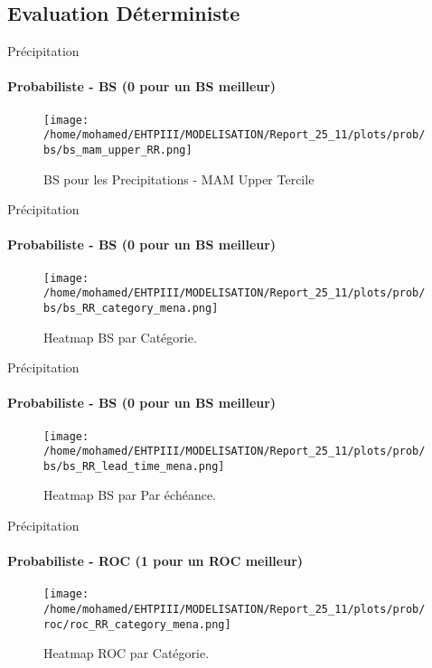 \subsection{Evaluation Déterministe}

\begin{frame}{Précipitation}
\framesubtitle{Probabiliste - BS (0 pour un BS meilleur)}

\begin{figure}
    \centering
    \texttt{[image: /home/mohamed/EHTPIII/MODELISATION/Report\_25\_11/plots/prob/bs/bs\_mam\_upper\_RR.png]}
    \caption{BS pour les Precipitations - MAM  Upper Tercile }
    \label{fig:enter-label}
\end{figure}
\end{frame}

\begin{frame}{Précipitation}
\framesubtitle{Probabiliste - BS (0 pour un BS meilleur)}

\begin{figure}
    \centering
    \texttt{[image: /home/mohamed/EHTPIII/MODELISATION/Report\_25\_11/plots/prob/bs/bs\_RR\_category\_mena.png]}
    \caption{Heatmap BS par Catégorie.  }
    \label{fig:enter-label}
\end{figure}
\end{frame}


\begin{frame}{Précipitation}
\framesubtitle{Probabiliste - BS (0 pour un BS meilleur)}

\begin{figure}
    \centering
    \texttt{[image: /home/mohamed/EHTPIII/MODELISATION/Report\_25\_11/plots/prob/bs/bs\_RR\_lead\_time\_mena.png]}
    \caption{Heatmap BS par Par échéance.}
    \label{fig:enter-label}
\end{figure}
\end{frame}




\begin{frame}{Précipitation}
\framesubtitle{Probabiliste - ROC (1 pour un ROC meilleur)}

\begin{figure}
    \centering
    \texttt{[image: /home/mohamed/EHTPIII/MODELISATION/Report\_25\_11/plots/prob/roc/roc\_RR\_category\_mena.png]}
    \caption{Heatmap ROC par Catégorie.  }
    \label{fig:enter-label}
\end{figure}
\end{frame}

